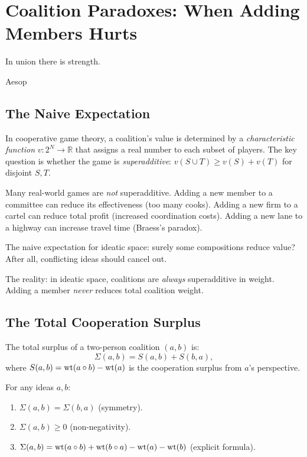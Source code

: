 \chapter{Coalition Paradoxes: When Adding Members Hurts}

\epigraph{In union there is strength.}{Aesop}

\section{The Naive Expectation}

In cooperative game theory, a coalition's value is determined by a \emph{characteristic function} $v: 2^N \to \mathbb{R}$ that assigns a real number to each subset of players. The key question is whether the game is \emph{superadditive}: $v(S \cup T) \geq v(S) + v(T)$ for disjoint $S, T$.

Many real-world games are \emph{not} superadditive. Adding a new member to a committee can reduce its effectiveness (too many cooks). Adding a new firm to a cartel can reduce total profit (increased coordination costs). Adding a new lane to a highway can increase travel time (Braess's paradox).

The naive expectation for ideatic space: surely some compositions reduce value? After all, conflicting ideas should cancel out.

The reality: in ideatic space, coalitions are \emph{always} superadditive in weight. Adding a member \emph{never} reduces total coalition weight.

\section{The Total Cooperation Surplus}

\begin{definition}
The total surplus of a two-person coalition $(a, b)$ is:
\[
\Sigma(a,b) = S(a,b) + S(b,a),
\]
where $S(a,b) = \operatorname{wt}(a \circ b) - \operatorname{wt}(a)$ is the cooperation surplus from $a$'s perspective.
\end{definition}

\begin{theorem}
\label{thm:total-surplus}
For any ideas $a, b$:
\begin{enumerate}
\item $\Sigma(a,b) = \Sigma(b,a)$ \quad (symmetry).
\item $\Sigma(a,b) \geq 0$ \quad (non-negativity).
\item $\Sigma(a,b) = \operatorname{wt}(a \circ b) + \operatorname{wt}(b \circ a) - \operatorname{wt}(a) - \operatorname{wt}(b)$ \quad (explicit formula).
\end{enumerate}
\end{theorem}

